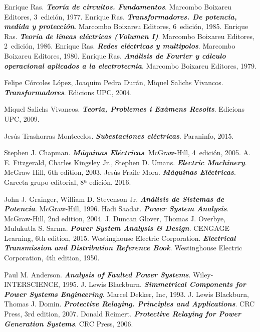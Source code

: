 \begin{thebibliography}{99}
     Enrique Ras. \textbf{\textit{Teoría de circuitos. Fundamentos}}.  Marcombo Boixareu Editores, 3\textordfeminine\ edición, 1977.
     Enrique Ras. \textbf{\textit{Transformadores. De potencia, medida y protección}}.  Marcombo Boixareu Editores, 6\textordfeminine\ edición, 1985.
     Enrique Ras. \textbf{\textit{Teoría de líneas eléctricas (Volumen I)}}.  Marcombo Boixareu Editores, 2\textordfeminine\ edición, 1986.
     Enrique Ras. \textbf{\textit{Redes eléctricas y multipolos}}.  Marcombo Boixareu Editores, 1980.
     Enrique Ras. \textbf{\textit{Análisis de Fourier y cálculo operacional aplicados a la electrotecnia}}.  Marcombo Boixareu Editores, 1979.

     Felipe Córcoles López, Joaquim Pedra Durán, Miquel Salichs Vivancos. \textbf{\textit{Transformadores}}.  Edicions UPC, 2004.

 	 Miquel Salichs Vivancos. \textbf{\textit{Teoria, Problemes i Exàmens Resolts}}.  Edicions UPC, 2009.
 
     Jesús Trashorras Montecelos. \textbf{\textit{Subestaciones eléctricas}}.  Paraninfo, 2015.


     Stephen J. Chapman. \textbf{\textit{Máquinas Eléctricas}}.  McGraw-Hill, 4\textordfeminine\ edición, 2005.
     A. E. Fitzgerald, Charles Kingsley Jr., Stephen D. Umans. \textbf{\textit{Electric Machinery}}.  McGraw-Hill, 6th edition, 2003.
     Jesús Fraile Mora. \textbf{\textit{Máquinas Eléctricas}}.  Garceta grupo editorial, 8ª edición, 2016.

     John J. Grainger, William D. Stevenson Jr. \textbf{\textit{Análisis de Sistemas de Potencia}}.  McGraw-Hill, 1996.
     Hadi Saadat. \textbf{\textit{Power System Analysis}}.  McGraw-Hill, 2nd edition, 2004.
     J. Duncan Glover, Thomas J. Overbye, Mulukutla S. Sarma. \textbf{\textit{Power System Analysis \& Design}}.  CENGAGE Learning, 6th edition, 2015.
     Westinghouse Electric Corporation. \textbf{\textit{Electrical Transmission and Distribution Reference Book}}.  Westinghouse Electric Corporation, 4th edition, 1950.

     Paul M. Anderson. \textbf{\textit{Analysis of Faulted Power Systems}}.  Wiley-INTERSCIENCE, 1995.
     J. Lewis Blackburn. \textbf{\textit{Simmetrical Components for Power Systems Engineering}}.  Marcel Dekker, Inc, 1993.
     J. Lewis Blackburn, Thomas J. Domin. \textbf{\textit{Protective Relaying. Principles and Applications}}.  CRC Press, 3rd edition, 2007.
     Donald Reimert. \textbf{\textit{Protective Relaying for Power Generation Systems}}.  CRC Press, 2006.



\end{thebibliography}
